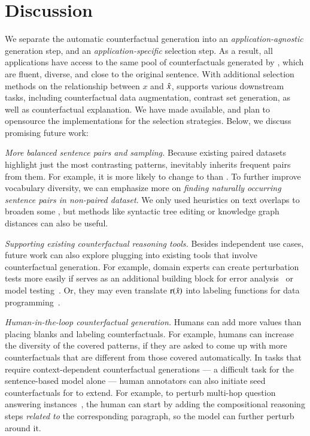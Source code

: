 \section{Discussion}
\label{sec:discuss}

We separate the automatic counterfactual generation into an \emph{application-agnostic} generation step, and an \emph{application-specific} selection step.
As a result, all applications have access to the same pool of counterfactuals generated by \sysname, which are fluent, diverse, and close to the original sentence.
With additional selection methods on the relationship between $x$ and $\hat{x}$, \sysname supports various downstream tasks, including counterfactual data augmentation, contrast set generation, as well as counterfactual explanation.
We have made \sysname available, and plan to opensource the implementations for the selection strategies.
Below, we discuss promising future work:


\emph{More balanced sentence pairs and sampling.}
Because existing paired datasets highlight just the most contrasting patterns, \sysname inevitably inherits frequent pairs from them.
For example, it is more likely to change  to  than .
To further improve vocabulary diversity, we can emphasize more on \emph{finding naturally occurring sentence pairs in non-paired dataset}. 
We only used heuristics on text overlaps to broaden some \tagstrs, but methods like syntactic tree editing or knowledge graph distances can also be useful.

\emph{Supporting existing counterfactual reasoning tools.}
Besides independent use cases, future work can also explore plugging \sysname into existing tools that involve counterfactual generation.
For example, domain experts can create perturbation tests more easily if \sysname serves as an additional building block for error analysis~\cite{wu2019errudite} or model testing~\cite{checklist:acl20}.
Or, they may even translate $\operatorname*{r}(\hat{x})$ into labeling functions for data programming~\cite{ratner2017snorkel}.


\emph{Human-in-the-loop counterfactual generation.}
Humans can add more values than placing blanks and labeling counterfactuals.
For example, humans can increase the diversity of the covered patterns, if they are asked to come up with more counterfactuals that are different from those covered automatically.
In tasks that require context-dependent counterfactual generations --- a difficult task for the sentence-based model alone --- human annotators can also initiate seed counterfactuals for \sysname to extend.
For example, to perturb multi-hop question answering instances~\cite{gardner2020contrast}, the human can start by adding the compositional reasoning steps \emph{related to} the corresponding paragraph, so the model can further perturb around it.